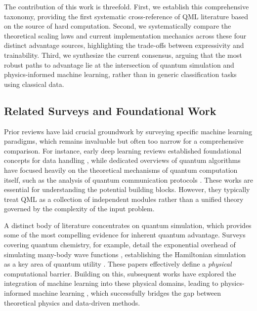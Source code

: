 \documentclass{article}
\begin{document}
The contribution of this work is threefold. First, we establish this comprehensive taxonomy, providing the first systematic cross-reference of QML literature based on the source of hard computation. Second, we systematically compare the theoretical scaling laws and current implementation mechanics across these four distinct advantage sources, highlighting the trade-offs between expressivity and trainability. Third, we synthesize the current consensus, arguing that the most robust paths to advantage lie at the intersection of quantum simulation and physics-informed machine learning, rather than in generic classification tasks using classical data.

\subsection{Related Surveys and Foundational Work}

\label{sec:related\_surveys\_and\_foundational\_work}

Prior reviews have laid crucial groundwork by surveying specific machine learning paradigms, which remains invaluable but often too narrow for a comprehensive comparison. For instance, early deep learning reviews established foundational concepts for data handling , while dedicated overviews of quantum algorithms have focused heavily on the theoretical mechanisms of quantum computation itself, such as the analysis of quantum communication protocols \cite{gilboa2023exponential}. These works are essential for understanding the potential building blocks. However, they typically treat QML as a collection of independent modules rather than a unified theory governed by the complexity of the input problem.

A distinct body of literature concentrates on quantum simulation, which provides some of the most compelling evidence for inherent quantum advantage. Surveys covering quantum chemistry, for example, detail the exponential overhead of simulating many-body wave functions , establishing the Hamiltonian simulation as a key area of quantum utility . These papers effectively define a \textit{physical} computational barrier. Building on this, subsequent works have explored the integration of machine learning into these physical domains, leading to physics-informed machine learning , which successfully bridges the gap between theoretical physics and data-driven methods.
\end{document}
